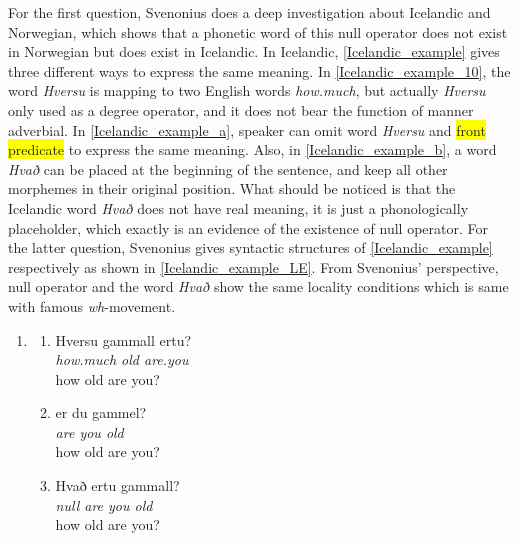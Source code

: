 \documentclass{ctexart}
\begin{document}
For the first question, Svenonius does a deep investigation about Icelandic and Norwegian, which shows that a phonetic word of this null operator does not exist in Norwegian but does exist in Icelandic. In Icelandic, \ref{Icelandic_example} gives three different ways to express the same meaning. In \ref{Icelandic_example_10}, the word \textit{Hversu} is mapping to two English words \textit{how.much}, but actually \textit{Hversu} only used as a degree operator, and it does not bear the function of manner adverbial. In \ref{Icelandic_example_a}, speaker can omit word \textit{Hversu} and \colorbox{yellow}{front predicate} to express the same meaning. Also, in \ref{Icelandic_example_b}, a word \textit{Hvað} can be placed at the beginning of the sentence, and keep all other morphemes in their original position. What should be noticed is that the Icelandic word \textit{Hvað} does not have real meaning, it is just a phonologically placeholder, which exactly is an evidence of the existence of null operator. For the latter question, Svenonius gives syntactic structures of \ref{Icelandic_example} respectively as shown in \ref{Icelandic_example_LE}. From Svenonius' perspective, null operator and the word \textit{Hvað} show the same locality conditions which is same with famous \textit{wh}-movement. 

\begin{enumerate}[resume]
    \item \label{Icelandic_example}
    
    \begin{enumerate}[ref=(\arabic{enumi}\alph*)]
        \item \label{Icelandic_example_10}
        Hversu gammall ertu? \\
        \textit{how.much old are.you} \\
        how old are you?

        \item \label{Icelandic_example_a}
        er du gammel? \\
        \textit{are you old} \\
        how old are you?

        \item \label{Icelandic_example_b}
        Hvað ertu gammall? \\
        \textit{null are you old} \\
        how old are you?

    \end{enumerate}   
    
\end{enumerate}
\end{document}
